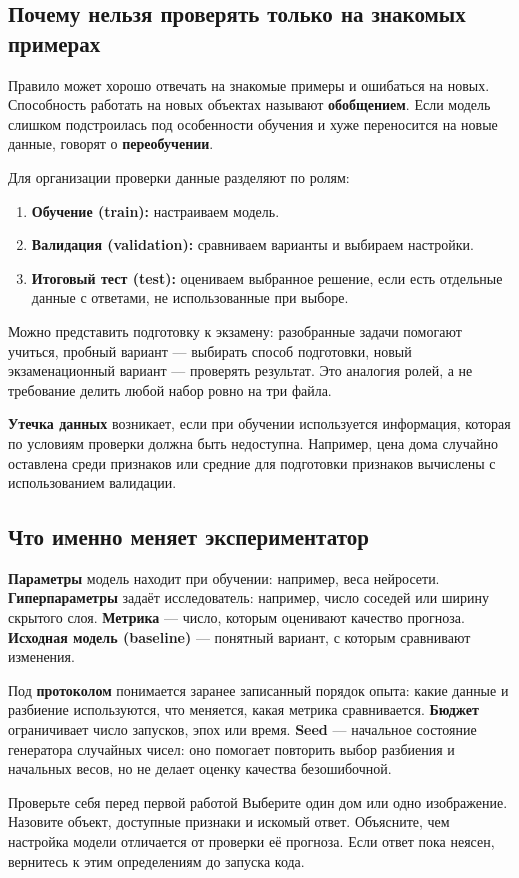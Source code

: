 \clearpage
\subsection*{Почему нельзя проверять только на знакомых примерах}
Правило может хорошо отвечать на знакомые примеры и ошибаться на новых. Способность работать на новых объектах называют \textbf{обобщением}. Если модель слишком подстроилась под особенности обучения и хуже переносится на новые данные, говорят о \textbf{переобучении}.

Для организации проверки данные разделяют по ролям:
\begin{enumerate}
\item \textbf{Обучение (train):} настраиваем модель.
\item \textbf{Валидация (validation):} сравниваем варианты и выбираем настройки.
\item \textbf{Итоговый тест (test):} оцениваем выбранное решение, если есть отдельные данные с ответами, не использованные при выборе.
\end{enumerate}
Можно представить подготовку к экзамену: разобранные задачи помогают учиться, пробный вариант --- выбирать способ подготовки, новый экзаменационный вариант --- проверять результат. Это аналогия ролей, а не требование делить любой набор ровно на три файла.

\textbf{Утечка данных} возникает, если при обучении используется информация, которая по условиям проверки должна быть недоступна. Например, цена дома случайно оставлена среди признаков или средние для подготовки признаков вычислены с использованием валидации.

\subsection*{Что именно меняет экспериментатор}
\textbf{Параметры} модель находит при обучении: например, веса нейросети. \textbf{Гиперпараметры} задаёт исследователь: например, число соседей или ширину скрытого слоя. \textbf{Метрика} --- число, которым оценивают качество прогноза. \textbf{Исходная модель (baseline)} --- понятный вариант, с которым сравнивают изменения.

Под \textbf{протоколом} понимается заранее записанный порядок опыта: какие данные и разбиение используются, что меняется, какая метрика сравнивается. \textbf{Бюджет} ограничивает число запусков, эпох или время. \textbf{Seed} --- начальное состояние генератора случайных чисел: оно помогает повторить выбор разбиения и начальных весов, но не делает оценку качества безошибочной.

\begin{keybox}{Проверьте себя перед первой работой}
Выберите один дом или одно изображение. Назовите объект, доступные признаки и искомый ответ. Объясните, чем настройка модели отличается от проверки её прогноза. Если ответ пока неясен, вернитесь к этим определениям до запуска кода.
\end{keybox}
